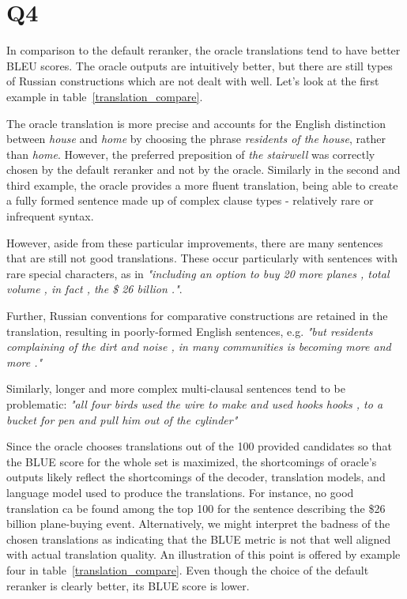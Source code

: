 \section*{Q4}

In comparison to the default reranker, the oracle translations tend to have better BLEU scores. The oracle outputs are intuitively better, but there are still types of Russian constructions which are not dealt with well. Let's look at the first example in table~\ref{translation_compare}.
  
The oracle translation is more precise and accounts for the English distinction between \textit{house} and \textit{home} by choosing the phrase \textit{residents of the house}, rather than \textit{home}. However, the preferred preposition of \textit{the stairwell} was correctly chosen by the default reranker and not by the oracle.
Similarly in the second and third example, the oracle provides a more fluent translation, being able to create a fully formed sentence made up of complex clause types - relatively rare or infrequent syntax.

However, aside from these particular improvements, there are many sentences that are still not good translations. These occur particularly with sentences with rare special characters, as in \textit{"including an option to buy 20 more planes , total volume , in fact , the \$ 26 billion ."}.

Further, Russian conventions for comparative constructions are retained in the translation, resulting in poorly-formed English sentences, e.g.  \textit{"but residents complaining of the dirt and noise , in many communities is becoming more and more ."}

Similarly, longer and more complex multi-clausal sentences tend to be problematic: \textit{"all four birds used the wire to make and used hooks hooks , to a bucket for pen and pull him out of the cylinder"}

Since the oracle chooses translations out of the 100 provided candidates so that the BLUE score for the whole set is maximized, the shortcomings of oracle's outputs likely reflect the shortcomings of the decoder, translation models, and language model used to produce the translations. For instance, no good translation ca be found among the top 100 for the sentence describing the \$26 billion plane-buying event.
Alternatively, we might interpret the badness of the chosen translations as indicating that the BLUE metric is not that well aligned with actual translation quality. An illustration of this point is offered by example four in table~\ref{translation_compare}. Even though the choice of the default reranker is clearly better, its BLUE score is lower.

